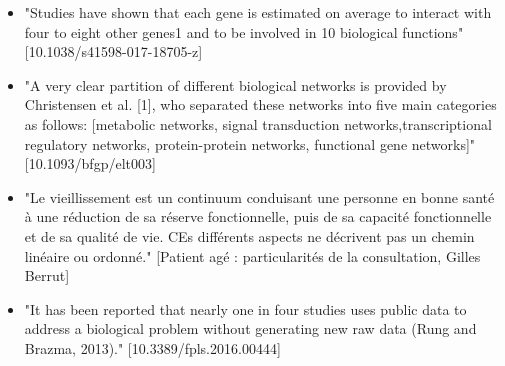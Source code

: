 \begin{itemize}
\item "Studies have shown that each gene is estimated on average to interact with four to eight other genes1 and to be involved in 10 biological functions" [10.1038/s41598-017-18705-z]
\item "A very clear partition of different biological networks is provided by Christensen et al. [1], who separated these networks into five main categories as follows: [metabolic networks, signal transduction networks,transcriptional regulatory networks, protein-protein networks, functional gene networks]" [10.1093/bfgp/elt003]
\item "Le vieillissement est un continuum conduisant une personne en bonne santé à une réduction de sa réserve fonctionnelle, puis de sa capacité fonctionnelle et de sa qualité de vie. CEs différents aspects ne décrivent pas un chemin linéaire ou ordonné." [Patient agé : particularités de la consultation, Gilles Berrut]
\item "It has been reported that nearly one in four studies uses public data to address a biological problem without generating new raw data (Rung and Brazma, 2013)." [10.3389/fpls.2016.00444]
\end{itemize}






